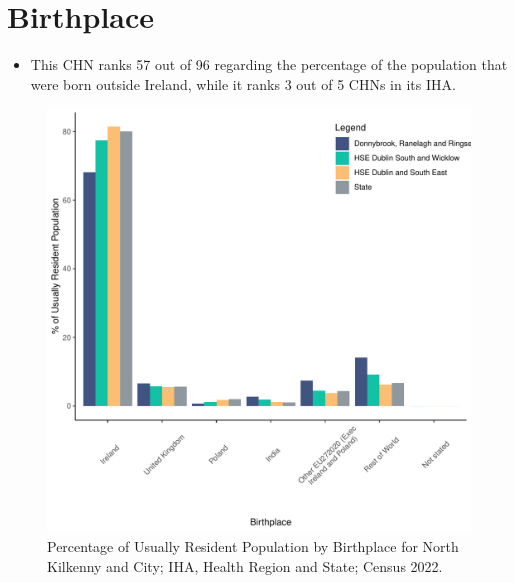 \documentclass{article}
\begin{document}
\section{Birthplace}\label{sect:Birth}
\begin{itemize}
\item This CHN ranks  57 out of 96 regarding the percentage of the population that were born outside Ireland, while it ranks  3 out of 5 CHNs in its IHA.
\end{itemize}
\begin{figure}[H]
	\centering
	\includegraphics[width = 130mm]{../figures/BirthED.pdf}
	\caption{Percentage of Usually Resident Population by Birthplace for North Kilkenny and City; IHA, Health Region and State; Census 2022.}
	\label{fig:vbnv}
	\end{figure}
	
\end{document}
